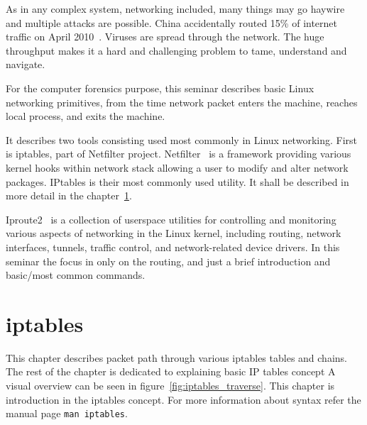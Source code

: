 \documentclass[times, utf8, seminar, english]{fer}
\begin{document}
As in any complex system, networking included, many things may go haywire and multiple attacks are possible. China accidentally routed 15\% of internet traffic on April 2010~\cite{HowChina98:online}. Viruses are spread through the network. The huge throughput makes it a hard and challenging problem to tame, understand and navigate.

For the computer forensics purpose, this seminar describes basic Linux networking primitives, from the time network packet enters the machine, reaches local process, and exits the machine.

It describes two tools consisting used most commonly in Linux networking. First is iptables, part of Netfilter project. Netfilter~\cite{netfilte6:online} is a framework providing various kernel hooks within network stack allowing a user to modify and alter network packages. IPtables is their most commonly used utility. It shall be described in more detail in the chapter~\ref{chp:iptables}.

Iproute2~\cite{shemming47:online} is a collection of userspace utilities for controlling and monitoring various aspects of networking in the Linux kernel, including routing, network interfaces, tunnels, traffic control, and network-related device drivers. In this seminar the focus in only on the routing, and just a brief introduction and basic/most common commands.

\chapter{iptables}
\label{chp:iptables}
This chapter describes packet path through various iptables tables and chains. The rest of the chapter is dedicated to explaining basic IP tables concept
A visual overview can be seen in figure~\ref{fig:iptables_traverse}. This chapter is introduction in the iptables concept. For more information about syntax refer the manual page \verb|man iptables|.
\end{document}
